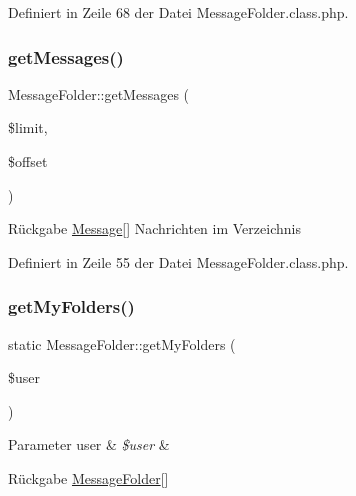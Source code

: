 Definiert in Zeile 68 der Datei Message\+Folder.\+class.\+php.

\mbox{\label{class_message_folder_ab287a9fb727864cdfc8364fac94b1f71}} 
\subsubsection{\texorpdfstring{get\+Messages()}{getMessages()}}
{\footnotesize\ttfamily Message\+Folder\+::get\+Messages (\begin{DoxyParamCaption}\item[{}]{\$limit,  }\item[{}]{\$offset }\end{DoxyParamCaption})}

\begin{DoxyReturn}{Rückgabe}
\mbox{\hyperlink{class_message}{Message}}\mbox{[}\mbox{]} Nachrichten im Verzeichnis 
\end{DoxyReturn}


Definiert in Zeile 55 der Datei Message\+Folder.\+class.\+php.

\mbox{\label{class_message_folder_a59eef48eb10e6fb6b004d8a82098b957}} 
\subsubsection{\texorpdfstring{get\+My\+Folders()}{getMyFolders()}}
{\footnotesize\ttfamily static Message\+Folder\+::get\+My\+Folders (\begin{DoxyParamCaption}\item[{}]{\$user }\end{DoxyParamCaption})\hspace{0.3cm}{\ttfamily [static]}}


\begin{DoxyParams}[1]{Parameter}
user & {\em \$user} & \\
\hline
\end{DoxyParams}
\begin{DoxyReturn}{Rückgabe}
\mbox{\hyperlink{class_message_folder}{Message\+Folder}}\mbox{[}\mbox{]} 
\end{DoxyReturn}


